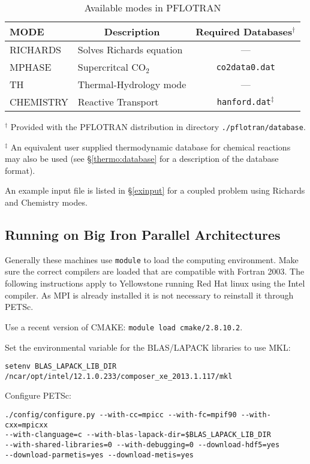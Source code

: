 \begin{table}[H]\centering
\caption{Available modes in PFLOTRAN}
\label{tmodes}
\vspace{3mm}
\begin{tabular}{llc}
\toprule
MODE & \multicolumn{1}{c}{Description} & Required Databases$^\dag$\\
\midrule
RICHARDS & Solves Richards equation & ---\\
MPHASE & Supercritcal CO$_2$ & {\tt co2data0.dat} \\
TH & Thermal-Hydrology mode & ---\\
CHEMISTRY & Reactive Transport & {\tt hanford.dat}$^\ddag$ \\
\bottomrule
\end{tabular}

\vspace{3mm}

\parbox{4.5in}{
\indent $^\dag$ Provided with the PFLOTRAN distribution in directory {\tt ./pflotran/database}.

\medskip

\indent $^\ddag$ An equivalent user supplied thermodynamic database for chemical reactions may also be used (see \S\ref{thermo:database} for a description of the database format). 
}
\end{table}

An example input file is listed in \S\ref{exinput} for a coupled problem using Richards and Chemistry modes.

\subsection{Running on Big Iron Parallel Architectures}

Generally these machines use {\footnotesize\tt module} to load the computing environment.
Make sure the correct compilers are loaded that are compatible with Fortran 2003. The following instructions apply to Yellowstone running Red Hat linux using the Intel compiler. As MPI is already installed it is not necessary to reinstall it through PETSc.

\noindent
Use a recent version of CMAKE: {\footnotesize\tt module load cmake/2.8.10.2}.

\noindent Set the environmental variable for the BLAS/LAPACK libraries to use MKL:

\noindent
{\footnotesize\tt setenv BLAS\_LAPACK\_LIB\_DIR /ncar/opt/intel/12.1.0.233/composer\_xe\_2013.1.117/mkl}

\noindent
Configure PETSc:
\footnotesize
\begin{Verbatim}
./config/configure.py --with-cc=mpicc --with-fc=mpif90 --with-cxx=mpicxx 
--with-clanguage=c --with-blas-lapack-dir=$BLAS_LAPACK_LIB_DIR 
--with-shared-libraries=0 --with-debugging=0 --download-hdf5=yes 
--download-parmetis=yes --download-metis=yes
\end{Verbatim}
\normalsize


